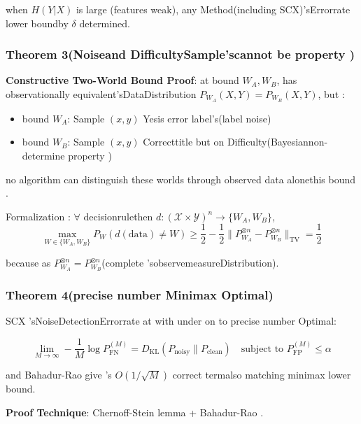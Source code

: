 \documentclass[
  12pt,
]{article}
\providecommand{\tightlist}{%
  \setlength{\itemsep}{0pt}\setlength{\parskip}{0pt}}
\begin{document}
when  \(H(Y|X)\) is large (features weak), any Method(including  SCX)'sErrorrate lower boundby 
\(\delta\) determined. 

\subsubsection{Theorem
3(Noiseand DifficultySample'scannot be property )}\label{theorem-3ux566aux58f0ux4e0eux56f0ux96beux6837ux672cux7684ux4e0dux53efux533aux5206ux6027}

\textbf{Constructive Two-World Bound Proof}: at bound 
\(W_A, W_B\), has observationally equivalent'sDataDistribution
\(P_{W_A}(X, Y) = P_{W_B}(X, Y)\), but : 

\begin{itemize}
\tightlist
\item
  bound  \(W_A\): Sample \((x, y)\) Yesis error label's(label noise)
\item
  bound  \(W_B\): Sample \((x, y)\) Correcttitle but on Difficulty(Bayesiannon-determine property )
\end{itemize}

no algorithm can distinguish these worlds through observed data alonethis bound . 

Formalization : \(\forall\) decisionrulethen 
\(d: (\mathcal{X} \times \mathcal{Y})^n \to \{W_A, W_B\}\), 
\[\max_{W \in \{W_A, W_B\}} P_W(d(\text{data}) \neq W) \geq \frac{1}{2} - \frac{1}{2}\|P_{W_A}^{\otimes n} - P_{W_B}^{\otimes n}\|_{\text{TV}} = \frac{1}{2}\]

because as 
\(P_{W_A}^{\otimes n} = P_{W_B}^{\otimes n}\)(complete 'sobservemeasureDistribution). 

\subsubsection{Theorem 4(precise number  Minimax
Optimal)}\label{theorem-4ux7cbeux786eux5e38ux6570-minimax-ux6700ux4f18}

SCX 'sNoiseDetectionErrorrate at with under on to precise number Optimal: 

\[\lim_{M \to \infty} -\frac{1}{M} \log P_{\text{FN}}^{(M)} = D_{\text{KL}}(P_{\text{noisy}} \| P_{\text{clean}}) \quad \text{subject to } P_{\text{FP}}^{(M)} \leq \alpha\]

and  Bahadur-Rao give 's \(O(1/\sqrt{M})\) correct termalso matching minimax lower bound. 

\textbf{Proof Technique}: Chernoff-Stein lemma  + Bahadur-Rao . 
\end{document}
